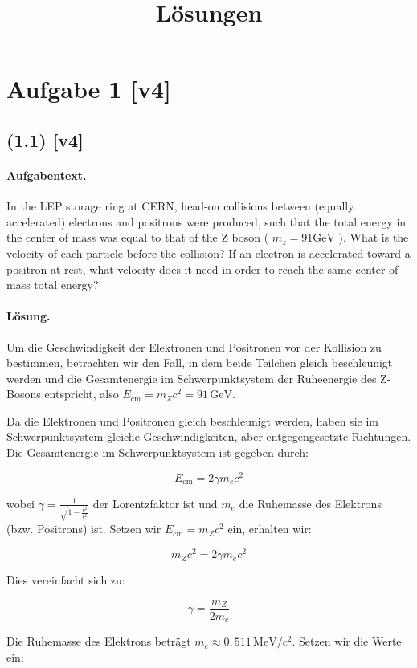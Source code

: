 \documentclass[11pt,a4paper]{article}
\title{Lösungen}
\date{}
\begin{document}
\maketitle

\section*{Aufgabe 1 [v4]}
\subsection*{(1.1) [v4]}
\paragraph{Aufgabentext.}
In the LEP storage ring at CERN, head-on collisions between (equally accelerated) electrons and positrons were produced, such that the total energy in the center of mass was equal to that of the Z boson ( $m_z=91 \mathrm{GeV}$ ). What is the velocity of each particle before the collision? If an electron is accelerated toward a positron at rest, what velocity does it need in order to reach the same center-of-mass total energy?

\paragraph{Lösung.}
Um die Geschwindigkeit der Elektronen und Positronen vor der Kollision zu bestimmen, betrachten wir den Fall, in dem beide Teilchen gleich beschleunigt werden und die Gesamtenergie im Schwerpunktsystem der Ruheenergie des Z-Bosons entspricht, also \( E_{\text{cm}} = m_Z c^2 = 91 \, \text{GeV} \).

Da die Elektronen und Positronen gleich beschleunigt werden, haben sie im Schwerpunktsystem gleiche Geschwindigkeiten, aber entgegengesetzte Richtungen. Die Gesamtenergie im Schwerpunktsystem ist gegeben durch:

\[
E_{\text{cm}} = 2 \gamma m_e c^2
\]

wobei \( \gamma = \frac{1}{\sqrt{1 - \frac{v^2}{c^2}}} \) der Lorentzfaktor ist und \( m_e \) die Ruhemasse des Elektrons (bzw. Positrons) ist. Setzen wir \( E_{\text{cm}} = m_Z c^2 \) ein, erhalten wir:

\[
m_Z c^2 = 2 \gamma m_e c^2
\]

Dies vereinfacht sich zu:

\[
\gamma = \frac{m_Z}{2 m_e}
\]

Die Ruhemasse des Elektrons beträgt \( m_e \approx 0{,}511 \, \text{MeV}/c^2 \). Setzen wir die Werte ein:
\end{document}
